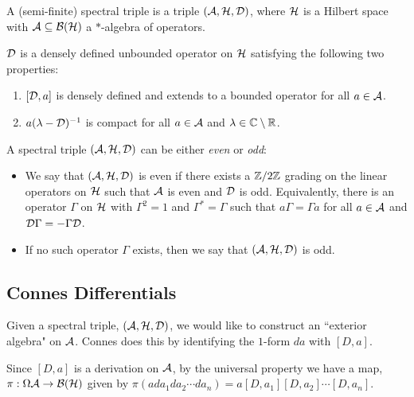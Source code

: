 \begin{definition}
    A (semi-finite) spectral triple is a triple $(\mathcal{A},\mathcal{H},\mathcal{D})$, where
    $\mathcal{H}$ is a Hilbert space with $\mathcal{A} \subseteq \mathcal{B}(\mathcal{H})$
    a $*$-algebra of operators.
    
    $\mathcal{D}$ is a densely defined unbounded operator on $\mathcal{H}$ satisfying the following
    two properties:
    \begin{enumerate}
        \item{} $[\mathcal{D},a]$ is densely defined and extends to a bounded operator
        for all $a \in \mathcal{A}$.
        \item{} $a(\lambda -\mathcal{D})^{-1}$ is compact for all $a \in \mathcal{A}$ and $\lambda \in \mathbb{C}\setminus \mathbb{R}$.
    \end{enumerate}
    
    A spectral triple $(\mathcal{A},\mathcal{H},\mathcal{D})$ can be either \emph{even} or \emph{odd}:
    \begin{itemize}
        \item{} We say that $(\mathcal{A},\mathcal{H},\mathcal{D})$ is even if there exists a
        $\mathbb{Z}/2\mathbb{Z}$ grading on the linear operators on $\mathcal{H}$ such that $\mathcal{A}$
        is even and $\mathcal{D}$ is odd. Equivalently, there is an operator $\Gamma$
        on $\mathcal{H}$ with $\Gamma^2 = 1$ and $\Gamma^* = \Gamma$ such that $a\Gamma = \Gamma a$ for all $a \in \mathcal{A}$
        and $\mathcal{D}\Gamma=-\Gamma\mathcal{D}$. 
        \item{} If no such operator $\Gamma$ exists, then we say that $(\mathcal{A},\mathcal{H},\mathcal{D})$
        is odd.
    \end{itemize}
\end{definition}



\subsection{Connes Differentials}
Given a spectral triple, $(\mathcal{A},\mathcal{H},\mathcal{D})$, we would like to construct an ``exterior algebra"
on $\mathcal{A}$. Connes does this by identifying the $1$-form $da$ with $[D,a]$.

Since $[D,a]$ is a derivation on $\mathcal{A}$, by the universal property we have a map, $\pi:\Omega\mathcal{A}\rightarrow \mathcal{B}(\mathcal{H})$
given by $\pi(ada_1da_2\cdots da_n) = a[D,a_1][D,a_2]\cdots[D,a_n]$.


